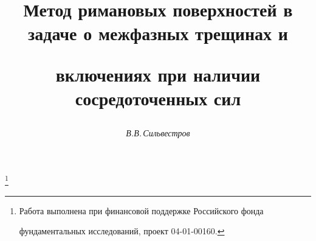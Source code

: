 

 


%  


 


\newcommand{\im}{\operatorname{Im}} 


\newcommand{\re}{\operatorname{Re}} 


\newcommand{\X}{\mathrm X} 


\newcommand{\tts}[1]{} 




 




\setcounter{page}{78} 












 


\author{\it В.В.\,Сильвестров} 




\title{Метод римановых поверхностей в задаче о межфазных трещинах и 


включениях при наличии сосредоточенных сил} 


\thanks{Работа выполнена при финансовой поддержке Российского фонда 


фундаментальных исследований, проект 04-01-00160.} 


 


\date{} 




\pagestyle{plain} %


